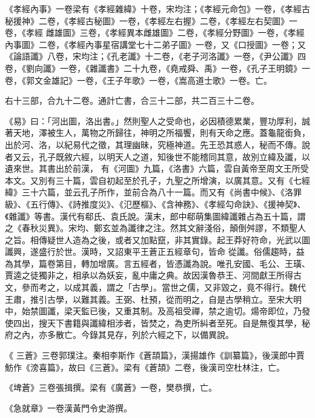 \begin{pinyinscope}
 《孝經內事》一卷梁有《孝經雜緯》十卷，宋均注；《孝經元命包》一卷，《孝經古秘援神》二卷，《孝經古秘圖》一卷，《孝經左右握》二卷，《孝經左右契圖》一卷，《孝經
 雌雄圖》三卷，《孝經異本雌雄圖》二卷，《孝經分野圖》一卷，《孝經內事圖》二卷，《孝經內事星宿講堂七十二弟子圖》一卷，又《口授圖》一卷；又《論語讖》八卷，宋均注；《孔老讖》十二卷，《老子河洛讖》一卷，《尹公讖》四卷，《劉向讖》一卷，《雜讖書》二十九卷，《堯戒舜、禹》一卷，《孔子王明鏡》一卷，《郭文金雄記》一卷，《王子年歌》一卷，《嵩高道士歌》一卷。亡。



 右十三部，合九十二卷。通計亡書，合三十二部，共二百三十二卷。



 《易》曰：「河出圖，洛出書。」然則聖人之受命也，必因積德累業，豐功厚利，誠著天地，澤被生人，萬物之所歸往，神明之所福饗，則有天命之應。蓋龜龍銜負，出於河、洛，以紀易代之徵，其理幽昧，究極神道。先王恐其惑人，秘而不傳。說者又云，孔子既敘六經，以明天人之道，知後世不能稽同其意，故別立緯及讖，以遺來世。其書出於前漢，
 有《河圖》九篇，《洛書》六篇，雲自黃帝至周文王所受本文。又別有三十篇，雲自初起至於孔子，九聖之所增演，以廣其意。又有《七經緯》三十六篇，並云孔子所作，並前合為八十一篇。而又有《尚書中候》、《洛罪級》、《五行傳》、《詩推度災》、《氾歷樞》、《含神務》、《孝經勾命訣》、《援神契》、《雜讖》等書。漢代有郗氏、袁氏說。漢末，郎中郗萌集圖緯讖雜占為五十篇，謂之《春秋災異》。宋均、鄭玄並為讖律之注。然其文辭淺俗，顛倒舛謬，不類聖人之旨。相傳疑世人造為之後，或者又加點竄，非其實錄。起王莽好符命，光武以圖讖興，遂盛行於世。漢時，又詔東平王蒼正五經章句，皆命
 從讖。俗儒趨時，益為其學，篇卷第目，轉加增廣。言五經者，皆憑讖為說。唯孔安國、毛公、王璜、賈逵之徒獨非之，相承以為妖妄，亂中庸之典。故因漢魯恭王、河間獻王所得古文，參而考之，以成其義，謂之「古學」。當世之儒，又非毀之，竟不得行。魏代王肅，推引古學，以難其義。王弼、杜預，從而明之，自是古學稍立。至宋大明中，始禁圖讖，梁天監已後，又重其制。及高祖受禪，禁之逾切。煬帝即位，乃發使四出，搜天下書籍與讖緯相涉者，皆焚之，為吏所糾者至死。自是無復其學，秘府之內，亦多散亡。今錄其見存，列於六經之下，以備異說。



 《
 三蒼》三卷郭璞注。秦相李斯作《蒼頡篇》，漢揚雄作《訓纂篇》，後漢郎中賈魴作《滂喜篇》，故曰《三蒼》。梁有《蒼頡》二卷，後漢司空杜林注，亡。



 《埤蒼》三卷張揖撰。梁有《廣蒼》一卷，樊恭撰，亡。



 《急就章》一卷漢黃門令史游撰。




\end{pinyinscope}
